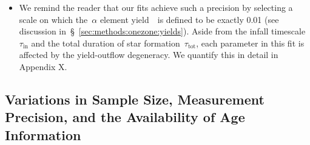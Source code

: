 \documentclass[ms.tex]{subfiles}
\begin{document}
\begin{itemize}
	\item We remind the reader that our fits achieve such a precision by
	selecting a scale on which the~$\alpha$ element yield~\yacc~is defined to
	be exactly 0.01 (see discussion in~\S~\ref{sec:methods:onezone:yields}).
	Aside from the infall timescale~$\tau_\text{in}$ and the total duration of
	star formation~$\tau_\text{tot}$, each parameter in this fit is affected by
	the yield-outflow degeneracy.
	We quantify this in detail in Appendix X.

\end{itemize}

\subsection{Variations in Sample Size, Measurement Precision, and the
Availability of Age Information}
\label{sec:mocks:variations}


\end{document}
